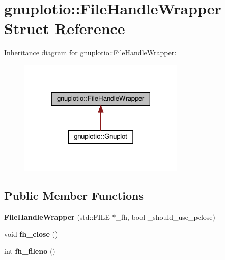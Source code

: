 \hypertarget{structgnuplotio_1_1FileHandleWrapper}{}\section{gnuplotio\+:\+:File\+Handle\+Wrapper Struct Reference}
\label{structgnuplotio_1_1FileHandleWrapper}


Inheritance diagram for gnuplotio\+:\+:File\+Handle\+Wrapper\+:\nopagebreak
\begin{figure}[H]
\begin{center}
\leavevmode
\includegraphics[width=225pt]{structgnuplotio_1_1FileHandleWrapper__inherit__graph}
\end{center}
\end{figure}
\subsection*{Public Member Functions}
\begin{DoxyCompactItemize}
\item 
\mbox{\label{structgnuplotio_1_1FileHandleWrapper_a26b2378e193a9c41be5aed97e11f9411}} 
{\bfseries File\+Handle\+Wrapper} (std\+::\+F\+I\+LE $\ast$\+\_\+fh, bool \+\_\+should\+\_\+use\+\_\+pclose)
\item 
\mbox{\label{structgnuplotio_1_1FileHandleWrapper_acafac45efd9c78ce621af4f3228c6f67}} 
void {\bfseries fh\+\_\+close} ()
\item 
\mbox{\label{structgnuplotio_1_1FileHandleWrapper_a3202ccd15d624f26dd2cf699d3456de6}} 
int {\bfseries fh\+\_\+fileno} ()
\end{DoxyCompactItemize}
